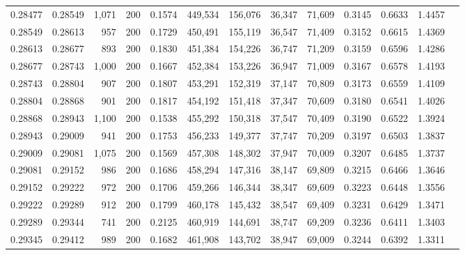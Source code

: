 \begin{tabular}{rrrrrrrrrrrrr}
0.28477 & 0.28549 &  1,071 & 200 &                                     0.1574 & 449,534 & 156,076 &  36,347 &  71,609 & 0.3145 & 0.6633 & 1.4457 \\
0.28549 & 0.28613 &    957 & 200 &                                     0.1729 & 450,491 & 155,119 &  36,547 &  71,409 & 0.3152 & 0.6615 & 1.4369 \\
0.28613 & 0.28677 &    893 & 200 &                                     0.1830 & 451,384 & 154,226 &  36,747 &  71,209 & 0.3159 & 0.6596 & 1.4286 \\
0.28677 & 0.28743 &  1,000 & 200 &                                     0.1667 & 452,384 & 153,226 &  36,947 &  71,009 & 0.3167 & 0.6578 & 1.4193 \\
0.28743 & 0.28804 &    907 & 200 &                                     0.1807 & 453,291 & 152,319 &  37,147 &  70,809 & 0.3173 & 0.6559 & 1.4109 \\
0.28804 & 0.28868 &    901 & 200 &                                     0.1817 & 454,192 & 151,418 &  37,347 &  70,609 & 0.3180 & 0.6541 & 1.4026 \\
0.28868 & 0.28943 &  1,100 & 200 &                                     0.1538 & 455,292 & 150,318 &  37,547 &  70,409 & 0.3190 & 0.6522 & 1.3924 \\
0.28943 & 0.29009 &    941 & 200 &                                     0.1753 & 456,233 & 149,377 &  37,747 &  70,209 & 0.3197 & 0.6503 & 1.3837 \\
0.29009 & 0.29081 &  1,075 & 200 &                                     0.1569 & 457,308 & 148,302 &  37,947 &  70,009 & 0.3207 & 0.6485 & 1.3737 \\
0.29081 & 0.29152 &    986 & 200 &                                     0.1686 & 458,294 & 147,316 &  38,147 &  69,809 & 0.3215 & 0.6466 & 1.3646 \\
0.29152 & 0.29222 &    972 & 200 &                                     0.1706 & 459,266 & 146,344 &  38,347 &  69,609 & 0.3223 & 0.6448 & 1.3556 \\
0.29222 & 0.29289 &    912 & 200 &                                     0.1799 & 460,178 & 145,432 &  38,547 &  69,409 & 0.3231 & 0.6429 & 1.3471 \\
0.29289 & 0.29344 &    741 & 200 &                                     0.2125 & 460,919 & 144,691 &  38,747 &  69,209 & 0.3236 & 0.6411 & 1.3403 \\
0.29345 & 0.29412 &    989 & 200 &                                     0.1682 & 461,908 & 143,702 &  38,947 &  69,009 & 0.3244 & 0.6392 & 1.3311 \\

\end{tabular}
